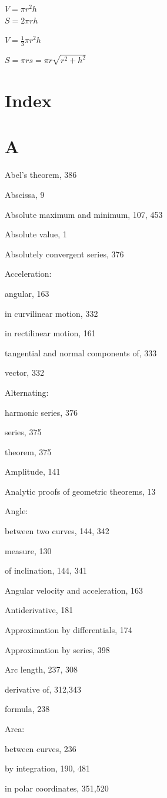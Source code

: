 \documentclass[10pt]{article}
\begin{document}
$V=\pi r^{2} h$\\
$S=2 \pi r h$

$V=\frac{1}{3} \pi r^{2} h$

$S=\pi r s=\pi r \sqrt{r^{2}+h^{2}}$

\section*{Index}
\section*{A}
Abel's theorem, 386

Abscissa, 9

Absolute maximum and minimum, 107, 453

Absolute value, 1

Absolutely convergent series, 376

Acceleration:

angular, 163

in curvilinear motion, 332

in rectilinear motion, 161

tangential and normal components of, 333

vector, 332

Alternating:

harmonic series, 376

series, 375

theorem, 375

Amplitude, 141

Analytic proofs of geometric theorems, 13

Angle:

between two curves, 144, 342

measure, 130

of inclination, 144, 341

Angular velocity and acceleration, 163

Antiderivative, 181

Approximation by differentials, 174

Approximation by series, 398

Arc length, 237, 308

derivative of, 312,343

formula, 238

Area:

between curves, 236

by integration, 190, 481

in polar coordinates, 351,520
\end{document}
